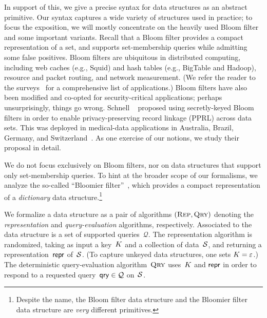 In support of this, we give a precise syntax for data structures as an abstract
primitive.  Our syntax captures a wide variety of structures used in practice;
%
to focus the exposition, we will mostly concentrate on the heavily
used Bloom filter~\cite{bloom1970space} and some important variants. Recall that
a Bloom filter provides a compact representation of a set, and supports
set-membership queries while admitting some false positives. Bloom filters are
ubiquitous in distributed computing, including web caches (e.g., Squid) and hash
tables (e.g., BigTable and Hadoop), resource and packet routing, and network
measurement. (We refer the reader to the
surveys~\cite{broder2004network,tarkoma2012theory} for a comprehensive list of
applications.)
%
Bloom filters have also been modified and co-opted for security-critical
applications; perhaps unsurprisingly, things go wrong. Schnell
\etal~\cite{schnell2011novel} proposed using secretly-keyed Bloom filters in
order to enable privacy-preserving record linkage (PPRL) across data sets.  This
was deployed in medical-data applications in Australia, Brazil, Germany, and
Switzerland~\cite{niedermeyer2014cryptanalysis}. As one exercise of our
notions, we study their proposal in detail. %
%

We do not focus exclusively on Bloom filters, nor on data structures
that support only set-membership queries.  To hint at the broader scope of our formalisms, we analyze the
so-called ``Bloomier filter''~\cite{chazelle2004bloomier}, which provides a
compact representation of a \emph{dictionary} data structure.\footnote{Despite the
name, the Bloom filter data structure and the Bloomier filter data structure are
\emph{very} different primitives.}

\fi

%
We formalize a data structure as a pair of algorithms $(\textsc{Rep}, \textsc{Qry})$ denoting
the \emph{representation} and \emph{query-evaluation} algorithms, respectively.
Associated to the data structure is a set of supported queries~$\mathcal{Q}$.
The representation algorithm is randomized, taking as input a
key~$K$ and a collection of data~$\mathcal{S}$, and returning a
representation~$\mathsf{repr}$ of~$\mathcal{S}$.  (To capture unkeyed data structures,
one sets $K=\varepsilon$.)
%
The deterministic query-evaluation algorithm~$\textsc{Qry}$ uses~$K$ and $\mathsf{repr}$ in
order to respond to a requested query~$\mathsf{qry} \in \mathcal{Q}$ on~$\mathcal{S}$.

